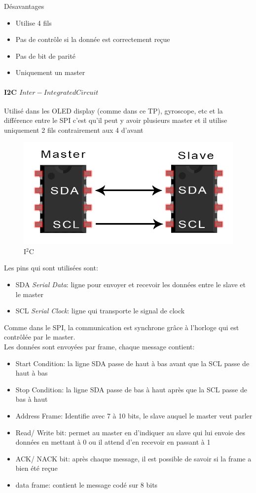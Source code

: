 Désavantages
\begin{itemize}
   \item Utilise 4 fils
   \item Pas de contrôle si la donnée est correctement reçue
   \item Pas de bit de parité
   \item Uniquement un master
\end{itemize}

\paragraph{I2C \(Inter-Integrated Circuit \)}
Utilisé dans les OLED display (comme dans ce TP), gyroscope, etc et la différence entre le SPI c'est qu'il peut y avoir plusieurs master et il utilise uniquement 2 fils contrairement aux 4 d'avant
\begin{figure}[h!]
   \centering
   \includegraphics[width=.4\textwidth]{images/i2c.png}
   \caption{I$^2$C}
\end{figure}
Les pins qui sont utilisées sont:
\begin{itemize}
   \item SDA \textit{Serial Data}: ligne pour envoyer et recevoir les données entre le slave et le master
   \item SCL \textit{Serial Clock}: ligne qui transporte le signal de clock
\end{itemize}
Comme dans le SPI, la communication est synchrone grâce à l'horloge qui est contrôlée par le master.\\
Les données sont envoyées par frame, chaque message contient:
\begin{itemize}
   \item Start Condition: la ligne SDA passe de haut à bas avant que la SCL passe de haut à bas
   \item Stop Condition: la ligne SDA passe de bas à haut après que la SCL passe de bas à haut
   \item Address Frame: Identifie avec 7 à 10 bits, le slave auquel le master veut parler
   \item Read/ Write bit: permet au master en d'indiquer au slave qui lui envoie des données en mettant à 0 ou il attend d'en recevoir en passant à 1 
   \item ACK/ NACK bit: après chaque message, il est possible de savoir si la frame a bien été reçue
   \item data frame: contient le message codé sur 8 bits 
\end{itemize}
